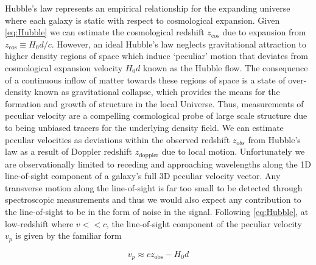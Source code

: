 Hubble's law represents an empirical relationship for the expanding
universe where each galaxy is static with respect to cosmological
expansion. Given \cref{eq:Hubble} we can estimate the
cosmological redshift \(z_\text{cos}\) due to expansion from
\(z_\text{cos} \equiv H_0 d/c\). However, an ideal Hubble's law neglects
gravitational attraction to higher density regions of space which induce
`peculiar' motion that deviates from cosmological expansion velocity
\(H_0d\) known as the Hubble flow. The consequence of a continuous
inflow of matter towards these regions of space is a state of
over-density known as gravitational collapse, which provides the means
for the formation and growth of structure in the local Universe. Thus,
measurements of peculiar velocity are a compelling cosmological probe of
large scale structure due to being unbiased tracers for the underlying
density field. We can estimate peculiar velocities as deviations within
the observed redshift \(z_{obs}\) from Hubble's law as a result of
Doppler redshift \(z_\text{doppler}\) due to local motion. Unfortunately
we are observationally limited to receding and approaching wavelengths
along the 1D line-of-sight component of a galaxy's full 3D peculiar
velocity vector. Any transverse motion along the line-of-sight is far
too small to be detected through spectroscopic measurements and thus we
would also expect any contribution to the line-of-sight to be in the
form of noise in the signal. Following \cref{eq:Hubble},
at low-redshift where \(v<<c\), the line-of-sight component of the
peculiar velocity \(v_p\) is given by the familiar form

\begin{equation}v_p \approx cz_\text{obs} - H_0d\label{eq:pecveloapprox}\end{equation}

